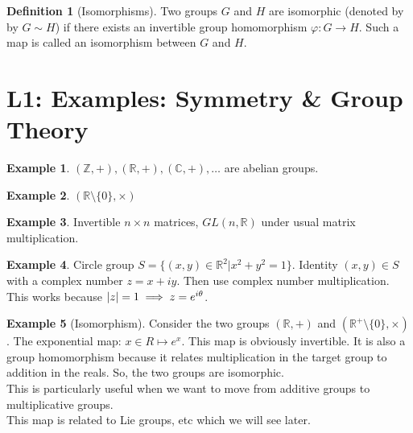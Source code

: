 \documentclass{book}
\theoremstyle{definition}
\newtheorem{defn}{Definition}[section]
\newtheorem{exmp}{Example}[section]
\begin{document}
\begin{defn}[Isomorphisms]
	Two groups $G$ and $H$ are isomorphic (denoted by by $G\sim H$) if there exists an invertible group homomorphism $\varphi: G \to H$. Such a map is called an isomorphism between $G$ and $H$. 
\end{defn}



\section{L1: Examples: Symmetry \& Group Theory }

\begin{exmp}
	$(\mathbb{Z},+), (\mathbb{R},+), (\mathbb{C},+), \dots$ are abelian groups. 
\end{exmp}

\begin{exmp}
	$(\mathbb{R} \setminus \{0\}, \times)$ 
\end{exmp}

\begin{exmp}
	Invertible $n\times n$ matrices, $GL(n,\mathbb{R})$ under usual matrix multiplication. 
\end{exmp}

\begin{exmp}
	Circle group $S = \{(x,y) \in \mathbb{R}^2  \vert x^2 + y^2 = 1    \}$. Identity $(x,y) \in S$ with a complex number $z = x+iy$. Then use complex number multiplication. This works because $\abs{z} = 1 \implies z= e^{i\theta}$.
\end{exmp}




\begin{exmp}[Isomorphism]
	Consider the two groups $(\mathbb{R},+)$ and $(\mathbb{R}^+\setminus\{0\}, \times)$. The exponential map: $x\in R \mapsto e^x$. This map is obviously invertible. It is also a group homomorphism because it relates multiplication in the target group to addition in the reals. So, the two groups are isomorphic. \\
	
	This is particularly useful when we want to move from additive groups to multiplicative groups. \\
	
	This map is related to Lie groups, etc which we will see later.  
\end{exmp}




\newpage
\end{document}
